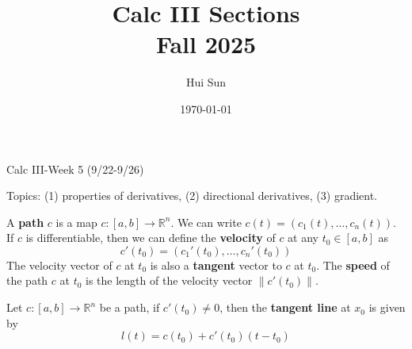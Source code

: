 \documentclass[openany]{book}
\title{Calc III Sections
\\ 
\vspace{0.4cm}
\large Fall 2025}
\date{\today}
\author{Hui Sun}
\newcommand{\R}{\mathbb{R}}
\begin{document}
\maketitle

\newpage


\begin{center}
    \Large Calc III-Week 5 (9/22-9/26)
\end{center}

\renewcommand\thesection{\arabic{section}}

\noindent
Topics: (1) properties of derivatives, (2) directional derivatives, (3) gradient.



 
 


\begin{defn}[path]
    A \textbf{path} $c$ is a map $c: [a,b]\to \R^n$. We can write $c(t)=(c_1(t), \dots, c_n(t))$. If $c$ is differentiable, then we can define the \textbf{velocity} of $c$ at any $t_0\in [a,b]$ as 
    \begin{equation*}
        c'(t_0)=\left(c_1'(t_0), \dots, c_n'(t_0)\right)
    \end{equation*}
    The velocity vector of $c$ at $t_0$ is also a \textbf{tangent} vector to $c$ at $t_0$. The \textbf{speed} of the path $c$ at $t_0$ is the length of the velocity vector $\|c'(t_0)\|$.
\end{defn}

\begin{defn}
    Let $c:[a,b]\to\R^n$ be a path, if $c'(t_0)\neq 0$, then the \textbf{tangent line} at $x_0$ is given by 
    \begin{equation*}
        l(t)=c(t_0)+c'(t_0)(t-t_0)
    \end{equation*}
\end{defn}
\end{document}
